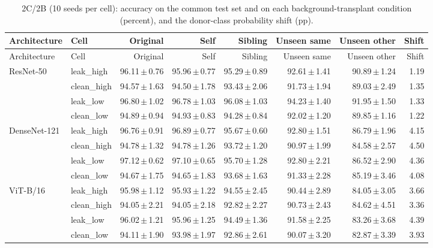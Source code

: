 {\scriptsize
\setlength{\tabcolsep}{3.5pt}
\begin{longtable}{llrrrrrr}
\caption{2C/2B (10 seeds per cell): accuracy on the common test set and on each background-transplant condition (percent), and the donor-class probability shift (pp).}\label{r:tab:factorial}\\
\toprule
Architecture & Cell & Original & Self & Sibling & Unseen same & Unseen other & Shift \\
\midrule
\endfirsthead
\toprule
Architecture & Cell & Original & Self & Sibling & Unseen same & Unseen other & Shift \\
\midrule
\endhead
\bottomrule
\endfoot
ResNet-50 & leak\_high & 96.11\,$\pm$\,0.76 & 95.96\,$\pm$\,0.77 & 95.29\,$\pm$\,0.89 & 92.61\,$\pm$\,1.41 & 90.89\,$\pm$\,1.24 & 1.19 \\
 & clean\_high & 94.57\,$\pm$\,1.63 & 94.50\,$\pm$\,1.78 & 93.43\,$\pm$\,2.06 & 91.73\,$\pm$\,1.94 & 89.03\,$\pm$\,2.49 & 1.35 \\
 & leak\_low & 96.80\,$\pm$\,1.02 & 96.78\,$\pm$\,1.03 & 96.08\,$\pm$\,1.03 & 94.23\,$\pm$\,1.40 & 91.95\,$\pm$\,1.50 & 1.33 \\
 & clean\_low & 94.89\,$\pm$\,0.94 & 94.93\,$\pm$\,0.83 & 94.28\,$\pm$\,0.84 & 92.02\,$\pm$\,1.20 & 89.85\,$\pm$\,1.16 & 1.22 \\
DenseNet-121 & leak\_high & 96.76\,$\pm$\,0.91 & 96.89\,$\pm$\,0.77 & 95.67\,$\pm$\,0.60 & 92.80\,$\pm$\,1.51 & 86.79\,$\pm$\,1.96 & 4.15 \\
 & clean\_high & 94.78\,$\pm$\,1.32 & 94.78\,$\pm$\,1.26 & 93.72\,$\pm$\,1.20 & 90.97\,$\pm$\,1.99 & 84.58\,$\pm$\,2.57 & 4.50 \\
 & leak\_low & 97.12\,$\pm$\,0.62 & 97.10\,$\pm$\,0.65 & 95.70\,$\pm$\,1.28 & 92.80\,$\pm$\,2.21 & 86.52\,$\pm$\,2.90 & 4.36 \\
 & clean\_low & 94.67\,$\pm$\,1.75 & 94.65\,$\pm$\,1.83 & 93.68\,$\pm$\,1.63 & 91.33\,$\pm$\,2.28 & 85.19\,$\pm$\,3.46 & 4.08 \\
ViT-B/16 & leak\_high & 95.98\,$\pm$\,1.12 & 95.93\,$\pm$\,1.22 & 94.55\,$\pm$\,2.45 & 90.44\,$\pm$\,2.89 & 84.05\,$\pm$\,3.05 & 3.66 \\
 & clean\_high & 94.05\,$\pm$\,2.21 & 94.05\,$\pm$\,2.18 & 92.82\,$\pm$\,2.27 & 90.73\,$\pm$\,2.43 & 84.62\,$\pm$\,4.51 & 3.36 \\
 & leak\_low & 96.02\,$\pm$\,1.21 & 95.96\,$\pm$\,1.25 & 94.49\,$\pm$\,1.36 & 91.58\,$\pm$\,2.25 & 83.26\,$\pm$\,3.68 & 4.39 \\
 & clean\_low & 94.11\,$\pm$\,1.90 & 93.98\,$\pm$\,1.97 & 92.86\,$\pm$\,2.61 & 90.07\,$\pm$\,3.20 & 82.87\,$\pm$\,3.39 & 3.93 \\

\end{longtable}}

